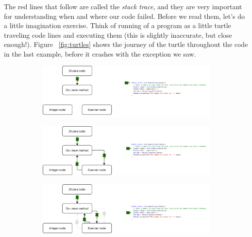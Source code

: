 The red lines that follow are called the \emph{stack trace}, and they are very important for understanding when and where our code failed. Before we read them, let's do a little imagination exercise. Think of running of a program as a little turtle traveling code lines and executing them (this is slightly inaccurate, but close enough!). Figure ~\ref{fig:turtles} shows the journey of the turtle throughout the code in the last example, before it crashes with the exception we saw. 

\begin{figure}[h!]
\begin{subfigure}{1\textwidth}
  \centering
  \includegraphics[width=1\textwidth]{lectures/images/code_turtle_1.png}
  \caption{}
  \label{fig:sturtle1}
\end{subfigure}%

\begin{subfigure}{1\textwidth}
  \centering
  \includegraphics[width=1\textwidth]{lectures/images/code_turtle_2.png}
  \caption{}
  \label{fig:sturtle2}
\end{subfigure}%

\begin{subfigure}{1.\textwidth}
  \centering
  \includegraphics[width=1\textwidth]{lectures/images/code_turtle_3.png}
  \caption{}
  \label{fig:sturtle3}
\end{subfigure}%


\end{figure}
